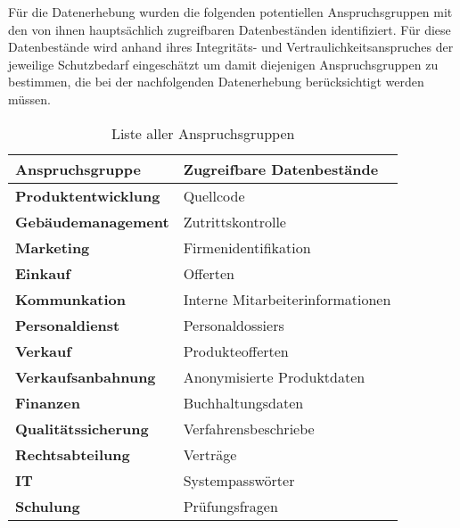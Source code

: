 \documentclass[../../main.tex]{subfiles}
\begin{document}
\begin{sloppypar}
Für die Datenerhebung wurden die folgenden potentiellen Anspruchsgruppen mit den von ihnen hauptsächlich zugreifbaren Datenbeständen identifiziert. Für diese Datenbestände wird anhand ihres Integritäts- und Vertraulichkeitsanspruches der jeweilige Schutzbedarf eingeschätzt um damit diejenigen Anspruchsgruppen zu bestimmen, die bei der nachfolgenden Datenerhebung berücksichtigt werden müssen.
\end{sloppypar}


\begin{table}[H]
\tablefontsize
\centering
\caption{Liste aller Anspruchsgruppen}
\label{potentielle_anspruchsgruppen}


\begin{tabular}{ |l|l| }


\hline
\tableheaderbgcolor
\textbf{Anspruchsgruppe} & \textbf{Zugreifbare Datenbestände}\\ 
\hline


\textbf{Produktentwicklung} & Quellcode                     \\ \hline
\textbf{Gebäudemanagement} & Zutrittskontrolle              \\ \hline
\textbf{Marketing} & Firmenidentifikation                   \\ \hline
\textbf{Einkauf} & Offerten                                 \\ \hline
\textbf{Kommunkation} & Interne Mitarbeiterinformationen    \\ \hline
\textbf{Personaldienst} & Personaldossiers                  \\ \hline
\textbf{Verkauf} & Produkteofferten                         \\ \hline
\textbf{Verkaufsanbahnung} & Anonymisierte Produktdaten     \\ \hline
\textbf{Finanzen} & Buchhaltungsdaten                       \\ \hline
\textbf{Qualitätssicherung} & Verfahrensbeschriebe          \\ \hline
\textbf{Rechtsabteilung} & Verträge                         \\ \hline
\textbf{IT} &  Systempasswörter                             \\ \hline
\textbf{Schulung} & Prüfungsfragen                          \\ \hline

\end{tabular}
\end{table}
\end{document}
